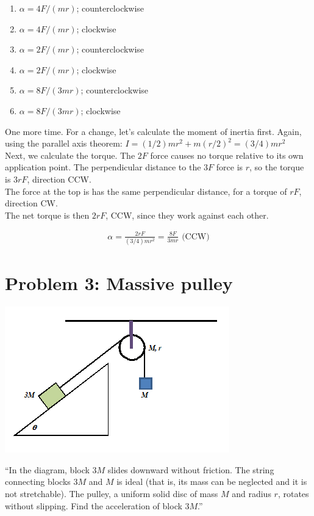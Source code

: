 \documentclass[8.01x]{subfiles}
\begin{document}
\begin{enumerate}
\item $\alpha=4F/(mr)$; counterclockwise
\item $\alpha=4F/(mr)$; clockwise
\item $\alpha=2F/(mr)$; counterclockwise
\item $\alpha=2F/(mr)$; clockwise
\item $\alpha=8F/(3mr)$; counterclockwise
\item $\alpha=8F/(3mr)$; clockwise
\end{enumerate}

One more time. For a change, let's calculate the moment of inertia first. Again, using the parallel axis theorem: $I = (1/2) m r^2 + m (r/2)^2 = (3/4) m r^2$\\
Next, we calculate the torque. The $2F$ force causes no torque relative to its own application point. The perpendicular distance to the $3F$ force is $r$, so the torque is $3 r F$, direction CCW.\\
The force at the top is has the same perpendicular distance, for a torque of $r F$, direction CW.\\
The net torque is then $2 r F$, CCW, since they work against each other.

\begin{align}
\alpha = \frac{2 r F}{(3/4) m r^2} = \frac{8 F}{3 m r} \text{ (CCW)}
\end{align}

\section{Problem 3: Massive pulley}

\begin{center}
\includegraphics[scale=1.0]{Graphics/midterm3p3}
\end{center}

``In the diagram, block $3M$ slides downward without friction. The string connecting blocks $3M$ and $M$ is ideal (that is, its mass can be neglected and it is not stretchable). The pulley, a uniform solid disc of mass $M$ and radius $r$, rotates without slipping. Find the acceleration of block $3M$.''
\end{document}
